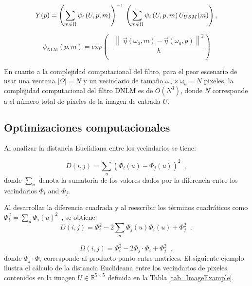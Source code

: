 \begin{equation}
\label{eq:dnlm}
Y(p)=\left(\sum_{m\in \Omega}\psi_{i}\left(U, p, m\right)\right)^{-1} \\ \left(\sum_{m\in \Omega}\psi_{i}\left(U, p, m\right)U_{USM}(m)\right),
\end{equation}


\begin{equation}
	\psi_{\text{NLM}}(p,m) =  exp\left(-\frac{ \left\| \displaystyle\ \overrightarrow{\eta}(\omega_{a},m) - \overrightarrow{\eta}(\omega_{a},p)  \right\|^{2}}{h}\right) 
\end{equation}


En cuanto a la complejidad computacional del filtro, para el peor escenario de usar una ventana $|\Omega| = N$ y un vecindario de tama\~no $\omega_{a} \times \omega_{a} = N$ pixeles, la complejidad computacional del filtro DNLM es de $O(N^3)$, donde $N$ corresponde a el n\'umero total de pixeles de la imagen de entrada $U$. 

\subsection{Optimizaciones computacionales}

Al analizar la distancia Euclidiana entre los vecindarios se tiene:

\begin{equation}
D\left(i,j\right)=\sum_{u}\left(\varPhi_{i}\left(u\right)-\varPhi_{j}\left(u\right)\right)^{2} \enspace ,
\end{equation}
 donde $\sum_{u}$ denota la sumatoria de los valores dados por la diferencia entre los vecindarios $\varPhi_i$ and $\varPhi_j$.

Al desarrollar la diferencia cuadrada y al reescribir los t\'erminos cuadr\'aticos como $\varPhi_{i}^{2}=\sum_{u}\varPhi_{i}\left(u\right)^{2} \enspace$,  se obtiene: 
\begin{equation}
 D\left(i,j\right)=\varPhi_{i}^{2}-2\sum_{u}\varPhi_{j}\left(u\right)\varPhi_{i}\left(u\right)+\varPhi_{j}^{2}  \enspace ,
 \label{eq_cuadratica}
\end{equation}


\begin{equation}
D\left(i,j\right)=\varPhi_{i}^{2}-2\varPhi_{j}\cdot\varPhi_{i}+\varPhi_{j}^{2} \enspace ,
\end{equation}
donde $\varPhi_{j}\cdot\varPhi_{i}$ corresponde al producto punto entre matrices. El siguiente ejemplo ilustra el c\'alculo de la distancia Euclideana entre los vecindarios de pixeles contenidos en la imagen $U\in\mathbb{R}^{5\times5}$ definida en la Tabla \ref{tab_ImageExample}.


